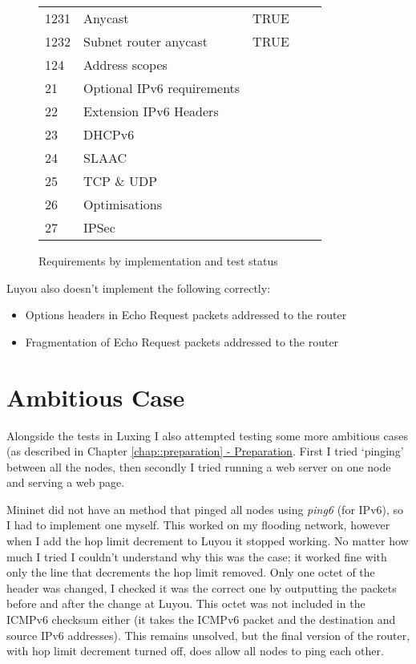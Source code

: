 \documentclass[12pt,a4paper,twoside,openany]{report}
\begin{document}
\begin{figure}
\begin{tabular}{lllll}
1231       & Anycast                     & TRUE    &             &            \\
1232       & Subnet router anycast       & TRUE    &             &            \\
124        & Address scopes              &         &             &            \\
21         & Optional IPv6 requirements              &         &             &            \\
22         & Extension IPv6 Headers           &         &             &            \\
23         & DHCPv6                      &         &             &            \\
24         & SLAAC                       &         &             &            \\
25         & TCP \& UDP                   &         &             &            \\
26         & Optimisations                &         &             &            \\
27         & IPSec                       &         &             &           
\end{tabular}
\caption{Requirements by implementation and test status}
\label{fig::test_status}
\end{figure}

\bigskip

Luyou also doesn't implement the following correctly:
\begin{itemize}
\item Options headers in Echo Request packets addressed to the router
\item Fragmentation of Echo Request packets addressed to the router
\end{itemize}


\section{Ambitious Case}

Alongside the tests in Luxing I also attempted testing some more ambitious cases (as described in Chapter \ref{chap::preparation}\hyperref[chap::preparation]{ - Preparation}.  First I tried `pinging' between all the nodes, then secondly I tried running a web server on one node and serving a web page.

\bigskip

Mininet did not have an method that pinged all nodes using \textit{ping6} (for IPv6), so I had to implement one myself.  This worked on my flooding network, however when I add the hop limit decrement to Luyou it stopped working. No matter how much I tried I couldn't understand why this was the case; it worked fine with only the line that decrements the hop limit removed. Only one octet of the header was changed, I checked it was the correct one by outputting the packets before and after the change at Luyou.  This octet was not included in the ICMPv6 checksum either (it takes the ICMPv6 packet and the destination and source IPv6 addresses).  This remains unsolved, but the final version of the router, with hop limit decrement turned off, does allow all nodes to ping each other.
\end{document}
